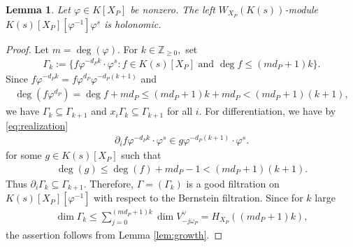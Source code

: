 \documentclass[11pt,a4paper,usenames,dvipsnames,reqno]{amsart}
\numberwithin{equation}{section}
\newcommand{\zz}{\mathbb Z}
\newtheorem{Lem}[Thm]{Lemma}
\theoremstyle{definition}
\theoremstyle{remark}
\begin{document}


\begin{Lem}\label{lem:p-1holonomic}
Let $\varphi\in K[X_P]$ be nonzero. The left $W_{X_P}(K(s))$-module $K(s)[X_P][\varphi^{-1}]\varphi^s$ is holonomic.
\end{Lem}


\begin{proof}
Let $m=\deg(\varphi)$. For $k\in \zz_{\ge 0},$ set
\begin{align*}
    \Gamma_k:=\{f\varphi^{-d_Pk}\cdot \varphi^{s}: f\in K(s)[X_P] \textrm{ and }\deg f \le (md_P+1)k\}.
\end{align*}
Since $f\varphi^{-d_P k}=f\varphi^{d_P}\varphi^{-d_P(k+1)}$ and 
\begin{align*}
    \deg(f \varphi^{d_P})= \deg f+md_P \le (md_P+1) k +md_P < (md_P+1)(k+1),
\end{align*}
we have $\Gamma_k\subseteq \Gamma_{k+1}$ and $x_i\Gamma_k\subseteq \Gamma_{k+1}$ for all $i$. For differentiation, we have by \eqref{eq:realization} 
\begin{align*}
    \partial_i f\varphi^{-d_Pk}\cdot \varphi^s\in g\varphi^{-d_P(k+1)}\cdot\varphi^s.
\end{align*}
for some $g\in K(s)[X_P]$ such that
\begin{align*}
    \deg(g)\le \deg(f)+md_P -1 < (md_P+1)(k+1).
\end{align*}
Thus $\partial_i\Gamma_k\subseteq \Gamma_{k+1}$. Therefore, $\Gamma=(\Gamma_k)$ is a good filtration on $K(s)[X_P][\varphi^{-1}]$ with respect to the Bernstein filtration. Since for $k$ large
    \begin{align*}
        \dim \Gamma_k \le \sum_{j=0}^{(md_P+1)k}\dim V^\lor_{-j\omega_P}=H_{X_P}((md_P+1)k),
    \end{align*}
the assertion follows from Lemma \ref{lem:growth}.
\end{proof}
\end{document}

